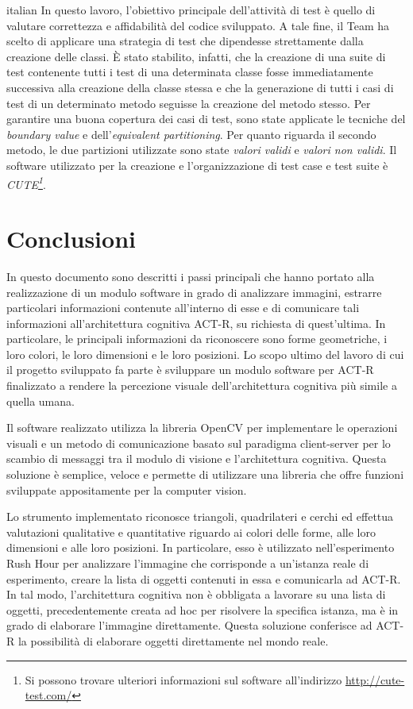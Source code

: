 \begin{otherlanguage*}{italian}
		In questo lavoro, l'obiettivo principale dell'attività di test è quello di valutare correttezza e affidabilità del codice sviluppato.
		A tale fine, il Team ha scelto di applicare una strategia di test che dipendesse strettamente dalla creazione delle classi.
		È stato stabilito, infatti, che la creazione di una suite di test contenente tutti i test di una determinata classe fosse immediatamente successiva alla creazione della classe stessa e che la generazione di tutti i casi di test di un determinato metodo seguisse la creazione del metodo stesso.
		Per garantire una buona copertura dei casi di test, sono state applicate le tecniche del \emph{boundary value} e dell'\emph{equivalent partitioning}.
		Per quanto riguarda il secondo metodo, le due partizioni utilizzate sono state \emph{valori validi} e \emph{valori non validi}.
		Il software utilizzato per la creazione e l'organizzazione di test case e test suite è \emph{CUTE\footnote{Si possono trovare ulteriori informazioni sul software all'indirizzo \url{http://cute-test.com/}}}.
		

	\section*{Conclusioni}
		In questo documento sono descritti i passi principali che hanno portato alla realizzazione di un modulo software in grado di analizzare immagini, estrarre particolari informazioni contenute all'interno di esse e di comunicare tali informazioni all'architettura cognitiva \mbox{ACT-R}, su richiesta di quest'ultima.
		In particolare, le principali informazioni da riconoscere sono	forme geometriche, i loro colori, le loro dimensioni e le loro posizioni.
		Lo scopo ultimo del lavoro di cui il progetto sviluppato fa parte è sviluppare un modulo software per \mbox{ACT-R} finalizzato a rendere la percezione visuale dell'architettura cognitiva più simile a quella umana.

		Il software realizzato utilizza la libreria \mbox{OpenCV} per implementare le operazioni visuali e un metodo di comunicazione basato sul paradigma client-server per lo scambio di messaggi tra il modulo di visione e l'architettura cognitiva. 
		Questa soluzione è semplice, veloce e permette di utilizzare una libreria che offre funzioni sviluppate appositamente per la computer vision.

		Lo strumento implementato riconosce triangoli, quadrilateri e cerchi ed effettua valutazioni qualitative e quantitative riguardo ai colori delle forme, alle loro dimensioni e alle loro posizioni.
		In particolare, esso è utilizzato nell'esperimento Rush Hour per analizzare l'immagine che corrisponde a un'istanza reale di esperimento, creare la lista di oggetti contenuti in essa e comunicarla ad \mbox{ACT-R}.
		In tal modo, l'architettura cognitiva non è obbligata a lavorare su una lista di oggetti, precedentemente creata ad hoc per risolvere la specifica istanza, ma è in grado di elaborare l'immagine direttamente. 
		Questa soluzione conferisce ad \mbox{ACT-R} la possibilità di elaborare oggetti direttamente nel mondo reale.


\end{otherlanguage*}
